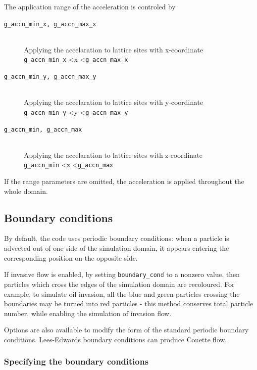 \documentclass[a4paper]{article}
\begin{document}
          The application range of the acceleration is controled by
          \begin{description}
          \item [{\tt g\_accn\_min\_x, g\_accn\_max\_x}]~\\
            Applying the accelaration to lattice sites with x-coordinate\\
            {{\tt g\_accn\_min\_x}} \textless x \textless {\tt g\_accn\_max\_x}  
          \item [{\tt g\_accn\_min\_y, g\_accn\_max\_y}]~\\
            Applying the accelaration to lattice sites with y-coordinate\\
            {{\tt g\_accn\_min\_y}} \textless y \textless {\tt g\_accn\_max\_y}  
          \item [{\tt g\_accn\_min, g\_accn\_max}]~\\
            Applying the accelaration to lattice sites with z-coordinate\\
            {{\tt g\_accn\_min}} \textless z \textless {\tt g\_accn\_max} 
          \end{description}
          If the range parameters are omitted, the acceleration is applied throughout the whole domain.


\subsection{Boundary conditions}

By default, the code uses periodic boundary conditions: when a particle
is advected out of one side of the simulation domain, it appears
entering the corresponding position on the opposite side.

If invasive flow is enabled, by setting {\tt boundary\_cond} to a
nonzero value, then particles which cross the edges of the simulation
domain are recoloured. For example, to simulate oil invasion, all the
blue and green particles crossing the boundaries may be turned into red
particles - this method conserves total particle number, while enabling
the simulation of invasion flow.

Options are also available to modify the form of the standard periodic boundary
conditions. Lees-Edwards boundary conditions can produce Couette flow.

\subsubsection{Specifying the boundary conditions}
\end{document}
